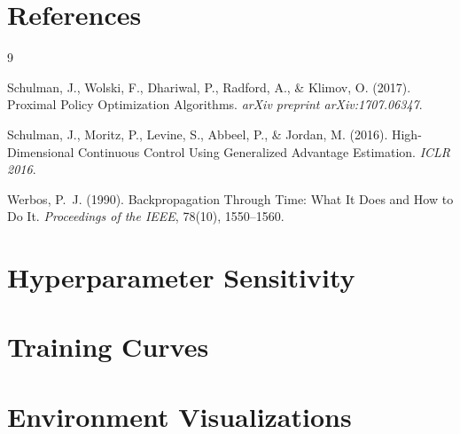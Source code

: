 \documentclass[11pt,a4paper]{article}
\begin{document}
\section*{References}
\label{sec:references}

\begin{thebibliography}{9}

  Schulman, J., Wolski, F., Dhariwal, P., Radford, A., \& Klimov, O. (2017).
  Proximal Policy Optimization Algorithms.
  \textit{arXiv preprint arXiv:1707.06347}.

  Schulman, J., Moritz, P., Levine, S., Abbeel, P., \& Jordan, M. (2016).
  High-Dimensional Continuous Control Using Generalized Advantage Estimation.
  \textit{ICLR 2016}.

  Werbos, P.~J. (1990).
  Backpropagation Through Time: What It Does and How to Do It.
  \textit{Proceedings of the IEEE}, 78(10), 1550--1560.

\end{thebibliography}

\appendix

\section{Hyperparameter Sensitivity}
\label{sec:appendix_hp}


\section{Training Curves}
\label{sec:appendix_curves}


\section{Environment Visualizations}
\label{sec:appendix_vis}

\end{document}
